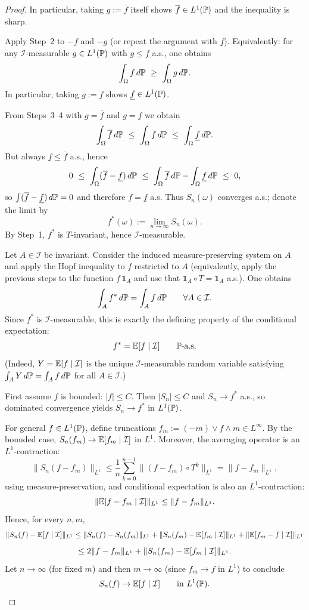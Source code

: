 \begin{proof}
In particular, taking $g:=\overline f$ itself shows $\overline f\in L^1(\mathbb{P})$ and the inequality is sharp.

\medskip
{}
Apply Step~2 to $-f$ and $-g$ (or repeat the argument with $\underline f$).
Equivalently: for any $\mathcal I$-measurable $g\in L^1(\mathbb{P})$ with $g\le \underline f$ a.s., one obtains
\[
\int_\Omega f\,d\Pp \ \ge\ \int_\Omega g\,d\Pp.
\]
In particular, taking $g:=\underline f$ shows $\underline f\in L^1(\mathbb{P})$.

\medskip
{}
From Steps~3--4 with $g=\overline f$ and $g=\underline f$ we obtain
\[
\int_\Omega \overline f\,d\Pp \ \le\ \int_\Omega f\,d\Pp \ \le\ \int_\Omega \underline f\,d\Pp.
\]
But always $\underline f\le \overline f$ a.s., hence
\[
0\ \le\ \int_\Omega (\overline f-\underline f)\,d\mathbb{P}
\ \le\ \int_\Omega \overline f\,d\mathbb{P}-\int_\Omega \underline f\,d\mathbb{P}
\ \le\ 0,
\]
so $\int (\overline f-\underline f)\,d\mathbb{P}=0$ and therefore $\overline f=\underline f$ a.s.
Thus $S_n(\omega)$ converges a.s.; denote the limit by
\[
f^*(\omega):=\lim_{n\to\infty} S_n(\omega).
\]
By Step~1, $f^*$ is $T$-invariant, hence $\mathcal I$-measurable.

\medskip
{}
Let $A\in\mathcal I$ be invariant. Consider the induced measure-preserving system on $A$ and apply the Hopf inequality
to $f$ restricted to $A$ (equivalently, apply the previous steps to the function $f\,\mathbf 1_A$ and use that
$\mathbf 1_A\circ T=\mathbf 1_A$ a.s.). One obtains
\[
\int_A f^*\,d\mathbb{P}=\int_A f\,d\mathbb{P}
\qquad\forall A\in\mathcal I.
\]
Since $f^*$ is $\mathcal I$-measurable, this is exactly the defining property of the conditional expectation:
\[
f^*=\mathbb{E}[f\mid\mathcal I]\qquad \mathbb{P}\text{-a.s.}
\]
(Indeed, $Y=\mathbb{E}[f\mid\mathcal I]$ is the unique $\mathcal I$-measurable random variable satisfying
$\int_A Y\,d\mathbb{P}=\int_A f\,d\mathbb{P}$ for all $A\in\mathcal I$.)

\medskip
{}
First assume $f$ is bounded: $|f|\le C$. Then $|S_n|\le C$ and $S_n\to f^*$ a.s.,
so dominated convergence yields $S_n\to f^*$ in $L^1(\mathbb{P})$.

For general $f\in L^1(\mathbb{P})$, define truncations $f_m:=(-m)\vee f\wedge m\in L^\infty$.
By the bounded case, $S_n(f_m)\to \mathbb{E}[f_m\mid\mathcal I]$ in $L^1$.
Moreover, the averaging operator is an $L^1$-contraction:
\[
\|S_n(f-f_m)\|_{L^1}\le \frac1n\sum_{k=0}^{n-1}\| (f-f_m)\circ T^k\|_{L^1}
=\|f-f_m\|_{L^1},
\]
using measure-preservation, and conditional expectation is also an $L^1$-contraction:
\[
\|\mathbb{E}[f-f_m\mid\mathcal I]\|_{L^1}\le \|f-f_m\|_{L^1}.
\]
Hence, for every $n,m$,
\[
\|S_n(f)-\mathbb{E}[f\mid\mathcal I]\|_{L^1}
\le \|S_n(f)-S_n(f_m)\|_{L^1}
+\|S_n(f_m)-\mathbb{E}[f_m\mid\mathcal I]\|_{L^1}
+\|\mathbb{E}[f_m-f\mid\mathcal I]\|_{L^1}
\]
\[
\le 2\|f-f_m\|_{L^1}+\|S_n(f_m)-\mathbb{E}[f_m\mid\mathcal I]\|_{L^1}.
\]
Let $n\to\infty$ (for fixed $m$) and then $m\to\infty$ (since $f_m\to f$ in $L^1$) to conclude
\[
S_n(f)\to \mathbb{E}[f\mid\mathcal I]\qquad\text{in }L^1(\mathbb{P}).
\]


\end{proof}
